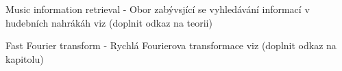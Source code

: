 \cleardoublepage
\chapter*{\listofabbrevname}
{}

\begin{acronym}[KolikMista]
		{Music information retrieval - Obor zabývsjící se vyhledávání informací v hudebních nahrákáh viz (doplnit odkaz na teorii)}

		{Fast Fourier transform - Rychlá Fourierova transformace viz (doplnit odkaz na kapitolu)}
\end{acronym}
